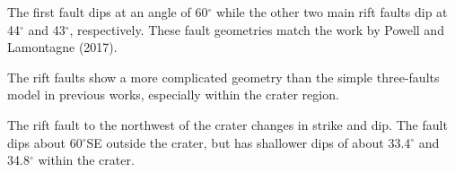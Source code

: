\documentclass[draft]{agujournal2018}
\begin{document}





\begin{keypoints}
  \item The first fault dips at an angle of 60$^\circ$ while the other two main rift faults dip at 44$^\circ$ and 43$^\circ$, respectively. These fault geometries match the work by Powell and Lamontagne (2017).
  
  \item The rift faults show a more complicated geometry than the simple three-faults model in previous works, especially within the crater region.
  
  \item The rift fault to the northwest of the crater changes in strike and dip. The fault dips about 60$^\circ$SE outside the crater, but has shallower dips of about 33.4$^\circ$ and 34.8$^\circ$ within the crater. 
  
  
\end{keypoints}

%
%

\end{document}
